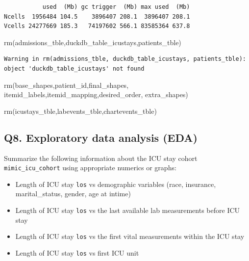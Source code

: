 \documentclass[
]{article}
\newenvironment{Shaded}{\begin{snugshade}}{\end{snugshade}}
\newcommand{\FunctionTok}[1]{\textcolor[rgb]{0.00,0.00,0.00}{#1}}
\newcommand{\NormalTok}[1]{\textcolor[rgb]{0.00,0.00,0.00}{#1}}
\begin{document}
\begin{verbatim}
           used  (Mb) gc trigger  (Mb) max used  (Mb)
Ncells  1956484 104.5    3896407 208.1  3896407 208.1
Vcells 24277669 185.3   74197602 566.1 83585364 637.8
\end{verbatim}

\begin{Shaded}
\begin{Highlighting}[]
\FunctionTok{rm}\NormalTok{(admissions\_tble,duckdb\_table\_icustays,patients\_tble)}
\end{Highlighting}
\end{Shaded}

\begin{verbatim}
Warning in rm(admissions_tble, duckdb_table_icustays, patients_tble): object 'duckdb_table_icustays' not found
\end{verbatim}

\begin{Shaded}
\begin{Highlighting}[]
\FunctionTok{rm}\NormalTok{(base\_shapes,patient\_id,final\_shapes,}
\NormalTok{   itemid\_labels,itemid\_mapping,desired\_order,}
\NormalTok{   extra\_shapes)}

\FunctionTok{rm}\NormalTok{(icustays\_tble,labevents\_tble,chartevents\_tble)}
\end{Highlighting}
\end{Shaded}

\hypertarget{q8.-exploratory-data-analysis-eda}{%
\subsection{Q8. Exploratory data analysis
(EDA)}\label{q8.-exploratory-data-analysis-eda}}

Summarize the following information about the ICU stay cohort
\texttt{mimic\_icu\_cohort} using appropriate numerics or graphs:

\begin{itemize}
\item
  Length of ICU stay \texttt{los} vs demographic variables (race,
  insurance, marital\_status, gender, age at intime)
\item
  Length of ICU stay \texttt{los} vs the last available lab measurements
  before ICU stay
\item
  Length of ICU stay \texttt{los} vs the first vital measurements within
  the ICU stay
\item
  Length of ICU stay \texttt{los} vs first ICU unit
\end{itemize}
\end{document}
